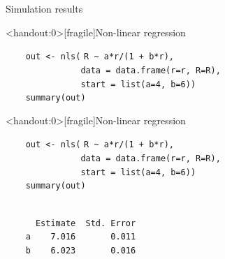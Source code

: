\documentclass[aspectratio=169,12pt,t]{beamer}
\begin{document}
\begin{frame}[c]{Simulation results}

\note{
}

\end{frame}



\begin{frame}<handout:0>[fragile]{Non-linear regression}

\vspace{5mm}

{
\verb|    out <- nls(| {\tt \vhilit R \verb|~| a*r/(1 + b*r)}\verb|,| \\
\verb|               data = data.frame(r=r, R=R),| \\
\verb|               start = list(a=4, b=6))| \\
\verb|    summary(out)|
}


\note{
}

\end{frame}


\begin{frame}<handout:0>[fragile]{Non-linear regression}
\addtocounter{framenumber}{-1}

\vspace{5mm}

\verb|    out <- nls(| {\tt \vhilit R \verb|~| a*r/(1 + b*r)}\verb|,| \\
\verb|               data = data.frame(r=r, R=R),| \\
\verb|               start = list(a=4, b=6))| \\
\verb|    summary(out)|

\vspace{8mm}

{\hilit
\verb|                          | \\
\verb|      Estimate  Std. Error| \\
\verb|    a    7.016       0.011| \\
\verb|    b    6.023       0.016|
}


\note{
}

\end{frame}
\end{document}
